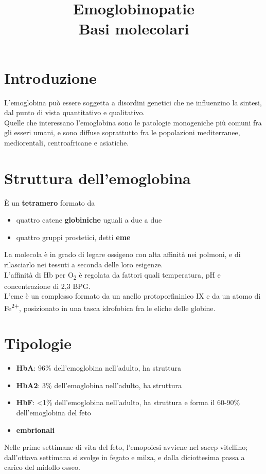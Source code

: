 \documentclass[a4paper, 12pt]{article}
\date{}
\title{%
  Emoglobinopatie \\
  \large Basi molecolari
}
\begin{document}
\maketitle

\section{Introduzione}
L'emoglobina può essere soggetta a disordini genetici che ne influenzino la sintesi, dal punto di vista quantitativo e qualitativo.\\
Quelle che interessano l'emoglobina sono le patologie monogeniche più comuni fra gli esseri umani, e sono diffuse soprattutto fra le popolazioni mediterranee, mediorentali, centroafricane e asiatiche.

\section{Struttura dell'emoglobina}
È un \textbf{tetramero} formato da
\begin{itemize}
  \item quattro catene \textbf{globiniche} uguali a due a due
  \item quattro gruppi prostetici, detti \textbf{eme}
\end{itemize}
La molecola è in grado di legare ossigeno con alta affinità nei polmoni, e di rilasciarlo nei tessuti a seconda delle loro esigenze.\\
L'affinità di Hb per O\textsubscript{2} è regolata da fattori quali temperatura, pH e concentrazione di 2,3 BPG.\\
L'eme è un complesso formato da un anello protoporfininico IX e da un atomo di Fe\textsuperscript{2+}, posizionato in una tasca idrofobica fra le eliche delle globine.

\section{Tipologie}
\begin{itemize}
  \item \textbf{HbA}: 96\% dell'emoglobina nell'adulto, ha struttura 
  \item \textbf{HbA2}: 3\% dell'emoglobina nell'adulto, ha struttura 
  \item \textbf{HbF}: <1\% dell'emoglobina nell'adulto, ha struttura  e forma il 60-90\% dell'emoglobina del feto
  \item \textbf{embrionali}
\end{itemize}
Nelle prime settimane di vita del feto, l'emopoiesi avviene nel saccp vitellino; dall'ottava settimana si svolge in fegato e milza, e dalla diciottesima passa a carico del midollo osseo.
\end{document}
